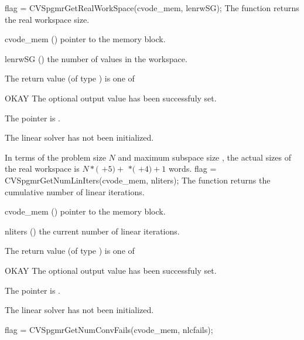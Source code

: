 {}
{
  flag = CVSpgmrGetRealWorkSpace(cvode\_mem, lenrwSG);
}
{
  The function  returns the
  {\cvspgmr} real workspace size.
}
{
  \begin{args}
  \item[cvode\_mem] ()
    pointer to the {\cvode} memory block.
  \item[lenrwSG] ()
    the number of  values in the {\cvspgmr} workspace.
  \end{args}
}
{
  The return value  (of type ) is one of
  \begin{args}
  \item[OKAY] 
    The optional output value has been successfuly set.
  \item[\Id{LIN\_NO\_MEM}]
    The  pointer is .
  \item[\Id{LIN\_NO\_LMEM}]
    The {\cvspgmr} linear solver has not been initialized.
  \end{args}
}
{
  In terms of the problem size $N$ and maximum subspace size , 
  the actual sizes of the real workspace is
  $N*($  $+ 5) +$  $*($  $ + 4) + 1$  words.
}
{
  flag = CVSpgmrGetNumLinIters(cvode\_mem, nliters);
}
{
  The function  returns the
  cumulative number of linear iterations.
}
{
  \begin{args}
  \item[cvode\_mem] ()
    pointer to the {\cvode} memory block.
  \item[nliters] ()
    the current number of linear iterations.
  \end{args}
}
{
  The return value  (of type ) is one of
  \begin{args}
  \item[OKAY] 
    The optional output value has been successfuly set.
  \item[\Id{LIN\_NO\_MEM}]
    The  pointer is .
  \item[\Id{LIN\_NO\_LMEM}]
    The {\cvspgmr} linear solver has not been initialized.
  \end{args}
}
{}
{
  flag = CVSpgmrGetNumConvFails(cvode\_mem, nlcfails);
}
